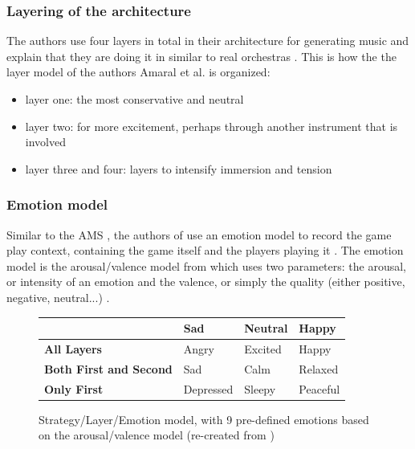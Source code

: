 \subsubsection{Layering of the architecture}

The authors use four layers in total in their architecture
for generating music and explain that they are doing it in \cite{stuart2019mozart}
similar to real orchestras \cite{amaral2022adaptive}.
This is how the the layer model of the authors 
Amaral et al. is organized:
\begin{itemize}
    \item layer one: the most conservative and neutral \cite{amaral2022adaptive}
    \item layer two: for more excitement, perhaps through another instrument that is involved
    \cite{amaral2022adaptive}
    \item layer three and four: layers to intensify
    immersion and tension \cite{amaral2022adaptive}
\end{itemize}

\subsubsection{Emotion model}



Similar to the AMS \cite{hutMcCormAms}, the authors of \cite{amaral2022adaptive} use an emotion model
to record the game play context, containing the game
itself and the players playing it \cite{amaral2022adaptive}.
The emotion model is the arousal/valence model from
\cite{russell1980circumplex} which uses two parameters:
the arousal, or intensity of an emotion and the valence,
or simply the quality (either positive, negative, neutral...) \cite{amaral2022adaptive}.

\begin{figure}[h]
\centering

\begin{tabular}{|l|l|l|l|}
\hline
\textbf{} & \textbf{Sad} & \textbf{Neutral} & \textbf{Happy} \\
\hline
\textbf{All Layers} & Angry & Excited & Happy \\
\hline
\textbf{Both First and Second} & Sad & Calm & Relaxed \\
\hline
\textbf{Only First} & Depressed & Sleepy & Peaceful \\
\hline
\end{tabular}
\caption{Strategy/Layer/Emotion model, with 9 pre-defined emotions based on the arousal/valence model (re-created from \cite{amaral2022adaptive})}
\label{fig:layer_emotion}

\end{figure}

